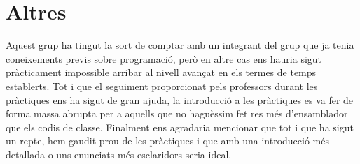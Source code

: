 \documentclass[a4paper,12pt]{article}
\begin{document}
\section{Altres}
Aquest grup ha tingut la sort de comptar amb un integrant del grup que ja tenia coneixements previs sobre programació, però en altre cas ens hauria sigut pràcticament impossible arribar al nivell avançat en els termes de temps establerts. Tot i que el seguiment proporcionat pels professors durant les pràctiques ens ha sigut de gran ajuda, la introducció a les pràctiques es va fer de forma massa abrupta per a aquells que no haguèssim fet res més d'ensamblador que els codis de classe. Finalment ens agradaria mencionar que tot i que ha sigut un repte, hem gaudit prou de les pràctiques i que amb una introducció més detallada o uns enunciats més esclaridors seria ideal.
\end{document}
